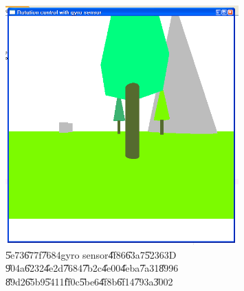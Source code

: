 \begin{figure}[th]
\caption{\U{5e73}\U{677f}\U{7684}gyro sensor\U{4f86}\U{63a7}\U{5236}3D%
\U{904a}\U{6232}\U{4e2d}\U{7684}\U{7b2c}\U{4e00}\U{4eba}\U{7a31}\U{8996}%
\U{89d2}\U{65b9}\U{5411}\U{ff0c}\U{5be6}\U{4f8b}\U{6f14}\U{793a}\U{3002}}
\begin{center}
\includegraphics[width=0.8\textwidth]{./figs/ASUS_3D_control_1.png}
\end{center}
\end{figure}

\bigskip

